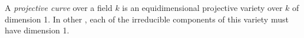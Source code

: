 \documentclass[12pt]{article}
\begin{document}
A \emph{projective curve} over a field $k$ is an equidimensional projective
variety over $k$ of dimension 1. In other , each of the
irreducible components of this variety must have dimension 1.
\end{document}
